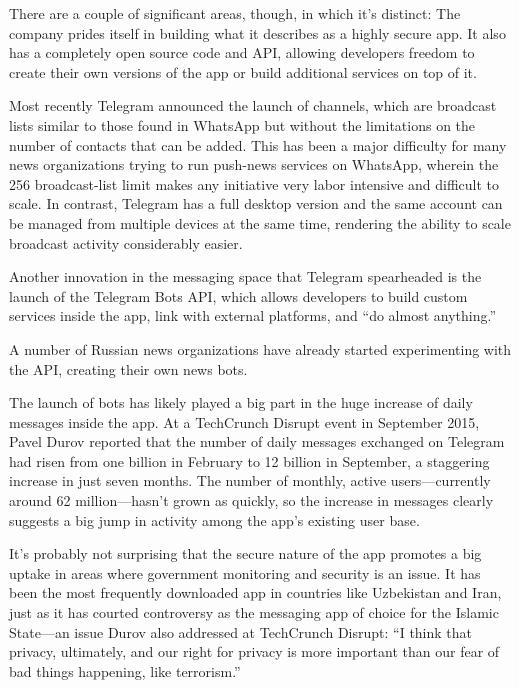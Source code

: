 \documentclass[notoc, symmetric, nobib, nols]{towcenter-guideto-book}
\begin{document}
There are a couple of significant areas, though, in which it's distinct: The company prides itself in building what it describes as a highly secure app. It also has a completely open source code and API, allowing developers freedom to create their own versions of the app or build additional services on top of it.

Most recently Telegram announced the launch of channels,\autocite{TelegramChannels} which are broadcast lists similar to those found in WhatsApp but without the limitations on the number of contacts that can be added. This has been a major difficulty for many news organizations trying to run push-news services on WhatsApp, wherein the 256 broadcast-list limit makes any initiative very labor intensive and difficult to scale. In contrast, Telegram has a full desktop version and the same account can be managed from multiple devices at the same time, rendering the ability to scale broadcast activity considerably easier.

Another innovation in the messaging space that Telegram spearheaded is the launch of the Telegram Bots API,\autocite{TelegramBots} which allows developers to build custom services inside the app, link with external platforms, and ``do almost anything.'' 

A number of Russian news organizations have already started experimenting with the API, creating their own news bots.

The launch of bots has likely played a big part in the huge increase of daily messages inside the app. At a TechCrunch Disrupt event in September 2015,\autocite{TechCrunch} Pavel Durov reported that the number of daily messages exchanged on Telegram had risen from one billion in February to 12 billion in September, a staggering increase in just seven months. The number of monthly, active users---currently around 62 million---hasn't grown as quickly, so the increase in messages clearly suggests a big jump in activity among the app's existing user base. 

It's probably not surprising that the secure nature of the app promotes a big uptake in areas where government monitoring and security is an issue. It has been the most frequently downloaded app in countries like Uzbekistan and Iran, just as it has courted controversy as the messaging app of choice for the Islamic State---an issue Durov also addressed at TechCrunch Disrupt: ``I think that privacy, ultimately, and our right for privacy is more important than our fear of bad things happening, like terrorism.''
\end{document}
